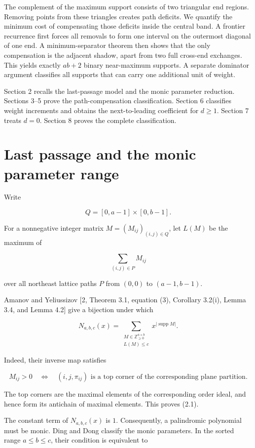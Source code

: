\documentclass[11pt]{article}
\numberwithin{equation}{section}
\begin{document}
The complement of the maximum support consists of two triangular end regions.
Removing points from these triangles creates path deficits. We quantify the
minimum cost of compensating those deficits inside the central band. A
frontier recurrence first forces all removals to form one interval on the
outermost diagonal of one end. A minimum-separator theorem then shows that the
only compensation is the adjacent shadow, apart from two full cross-end
exchanges. This yields exactly $ab+2$ binary near-maximum supports. A separate
dominator argument classifies all supports that can carry one additional
unit of weight.

Section 2 recalls the last-passage model and the monic parameter reduction.
Sections 3--5 prove the path-compensation classification. Section 6 classifies
weight increments and obtains the next-to-leading coefficient for $d\ge1$.
Section 7 treats $d=0$. Section 8 proves the complete classification.

\section{Last passage and the monic parameter range}


Write

\nopagebreak[4]
\[
Q=[0,a-1]\times[0,b-1].
\]

For a nonnegative integer matrix $M=(M_{ij})_{(i,j)\in Q}$, let $L(M)$ be
the maximum of

\nopagebreak[4]
\[
\sum_{(i,j)\in P}M_{ij}
\]

over all northeast lattice paths $P$ from $(0,0)$ to $(a-1,b-1)$.

Amanov and Yeliussizov [2, Theorem 3.1, equation (3), Corollary 3.2(i),
Lemma 3.4, and Lemma 4.2] give a bijection under which

\nopagebreak[4]
\[
N_{a,b,c}(x)
=\sum_{\substack{M\in\mathbb Z_{\ge0}^{a\times b}\\L(M)\le c}}
x^{|\operatorname{supp}M|}.
\tag{2.1}
\]

Indeed, their inverse map satisfies

\nopagebreak[4]
\[
M_{ij}>0
\quad\Longleftrightarrow\quad
(i,j,\pi_{ij})
\text{ is a top corner of the corresponding plane partition}.
\]

The top corners are the maximal elements of the corresponding order ideal,
and hence form its antichain of maximal elements. This proves (2.1).

The constant term of $N_{a,b,c}(x)$ is $1$. Consequently, a palindromic
polynomial must be monic. Ding and Dong \cite[Lemma~2.3(a)]{ding2019} classify the monic
parameters. In the sorted range $a\le b\le c$, their condition is equivalent
to
\end{document}
